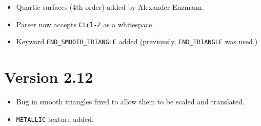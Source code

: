 \begin{itemize}
\item Quartic surfaces (4th order) added by
Alexander Enzmann.
\item Parser now accepts {\tt Ctrl-Z} as a whitespace.
\item Keyword {\tt END_SMOOTH_TRIANGLE}
added (previously, {\tt END_TRIANGLE} was used.)
\end{itemize}

\section*{Version 2.12}

\begin{itemize}
\item Bug in smooth triangles fixed to allow them to be scaled and translated.
\item {\tt METALLIC} texture added.
\end{itemize}

